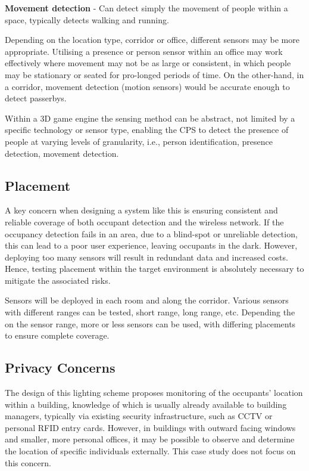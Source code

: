 \textbf{Movement detection} - Can detect simply the movement of people within a space, typically detects walking and running.

Depending on the location type, corridor or office, different sensors may be more appropriate. Utilising a presence or person sensor within an office may work effectively where movement may not be as large or consistent, in which people may be stationary or seated for pro-longed periods of time. On the other-hand, in a corridor, movement detection (motion sensors) would be accurate enough to detect passerbys.

Within a 3D game engine the sensing method can be abstract, not limited by a specific technology or sensor type, enabling the CPS to detect the presence of people at varying levels of granularity, i.e., person identification, presence detection, movement detection.

\subsection{Placement} %
\label{sub:placement}
A key concern when designing a system like this is ensuring consistent and reliable coverage of both occupant detection and the wireless network. If the occupancy detection fails in an area, due to a blind-spot or unreliable detection, this can lead to a poor user experience, leaving occupants in the dark. However, deploying too many sensors will result in redundant data and increased costs. Hence, testing placement within the target environment is absolutely necessary to mitigate the associated risks. 

Sensors will be deployed in each room and along the corridor. Various sensors with different ranges can be tested, short range, long range, etc. Depending the on the sensor range, more or less sensors can be used, with differing placements to ensure complete coverage.

\subsection{Privacy Concerns} %
\label{sub:privacy_concerns}
The design of this lighting scheme proposes monitoring of the occupants' location within a building, knowledge of which is usually already available to building managers, typically via existing security infrastructure, such as CCTV or personal RFID entry cards. However, in buildings with outward facing windows and smaller, more personal offices, it may be possible to observe and determine the location of specific individuals externally. This case study does not focus on this concern.

